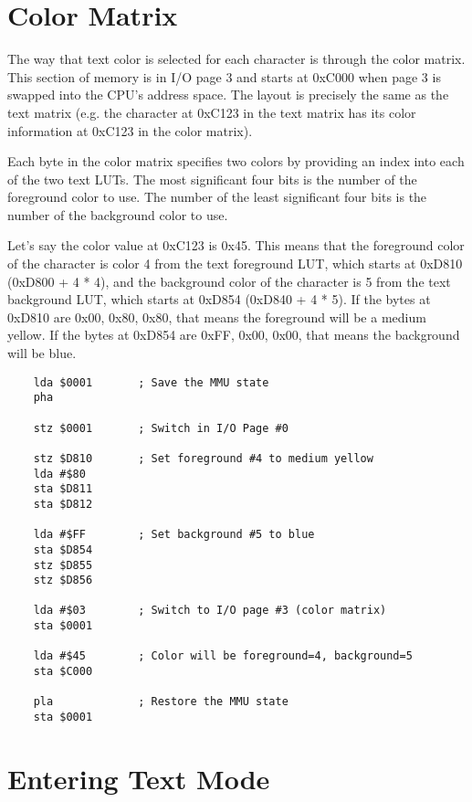 \section{Color Matrix}

The way that text color is selected for each character is through the color matrix. This section of memory is in I/O page 3 and starts at 0xC000 when page 3 is swapped into the CPU’s address space. The layout is precisely the same as the text matrix (e.g. the character at 0xC123 in the text matrix has its color information at 0xC123 in the color matrix).

Each byte in the color matrix specifies two colors by providing an index into each of the two text LUTs. The most significant four bits is the number of the foreground color to use. The number of the least significant four bits is the number of the background color to use.

Let’s say the color value at 0xC123 is 0x45. This means that the foreground color of the character is color 4 from the text foreground LUT, which starts at 0xD810 (0xD800 + 4 * 4), and the background color of the character is 5 from the text background LUT, which starts at 0xD854 (0xD840 + 4 * 5). If the bytes at 0xD810 are 0x00, 0x80, 0x80, that means the foreground will be a medium yellow. If the bytes at 0xD854 are 0xFF, 0x00, 0x00, that means the background will be blue.

\begin{verbatim}
    lda $0001       ; Save the MMU state
    pha

    stz $0001       ; Switch in I/O Page #0

    stz $D810       ; Set foreground #4 to medium yellow
    lda #$80
    sta $D811
    sta $D812

    lda #$FF        ; Set background #5 to blue
    sta $D854
    stz $D855
    stz $D856

    lda #$03        ; Switch to I/O page #3 (color matrix)
    sta $0001

    lda #$45        ; Color will be foreground=4, background=5
    sta $C000

    pla             ; Restore the MMU state
    sta $0001
\end{verbatim}

\section{Entering Text Mode}

